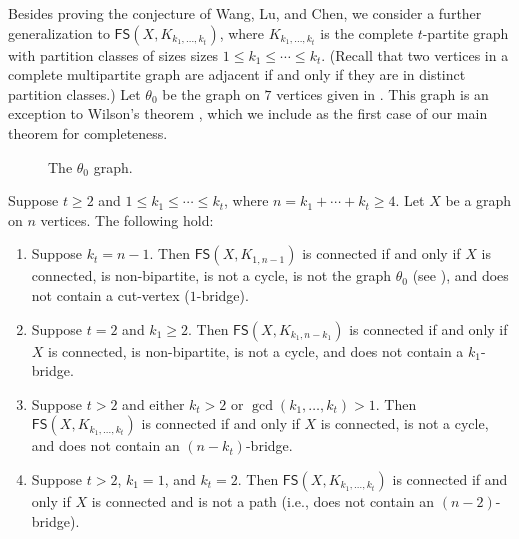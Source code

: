 \documentclass{mystyle}
\newcommand{\FS}{\mathsf{FS}}
\begin{document}
Besides proving the conjecture of Wang, Lu, and Chen, we consider a further generalization to $\FS(X, K_{k_1, \ldots, k_t})$, where $K_{k_1, \ldots, k_t}$ is the complete $t$-partite graph with partition classes of sizes sizes $1 \leq k_1 \leq \cdots \leq k_t$. (Recall that two vertices in a complete multipartite graph are adjacent if and only if they are in distinct partition classes.) Let $\theta_0$ be the graph on $7$ vertices given in . This graph is an exception to Wilson's theorem \cite{wilson1974}, which we include as the first case of our main theorem for completeness. 
\begin{figure}[ht]
    \centering
    \caption{The $\theta_0$ graph.}
    \label{fig_theta_0}
\end{figure}
\begin{theorem}\label{thm_main}
    Suppose $t \geq 2$ and $1 \leq k_1 \leq \cdots \leq k_t$, where $n = k_1 + \cdots + k_t \geq 4$. Let $X$ be a graph on $n$ vertices. The following hold:
    \begin{enumerate}
        \item Suppose $k_t = n - 1$. Then $\FS(X, K_{1, n-1})$ is connected if and only if $X$ is connected, is non-bipartite, is not a cycle, is not the graph $\theta_0$ (see ), and does not contain a cut-vertex ($1$-bridge). 
        \item Suppose $t = 2$ and $k_1 \geq 2$. Then $\FS(X, K_{k_1, n - k_1})$ is connected if and only if $X$ is connected, is non-bipartite, is not a cycle, and does not contain a $k_1$-bridge. 
        \item Suppose $t > 2$ and either $k_t > 2$ or $\gcd(k_1, \ldots, k_t) > 1$. Then $\FS(X, K_{k_1, \ldots, k_t})$ is connected if and only if $X$ is connected, is not a cycle, and does not contain an $(n - k_t)$-bridge.
        \item Suppose $t > 2$, $k_1 = 1$, and $k_t = 2$. Then $\FS(X, K_{k_1, \ldots, k_t})$ is connected if and only if $X$ is connected and is not a path (i.e., does not contain an $(n - 2)$-bridge).
    \end{enumerate}
\end{theorem}
\end{document}
